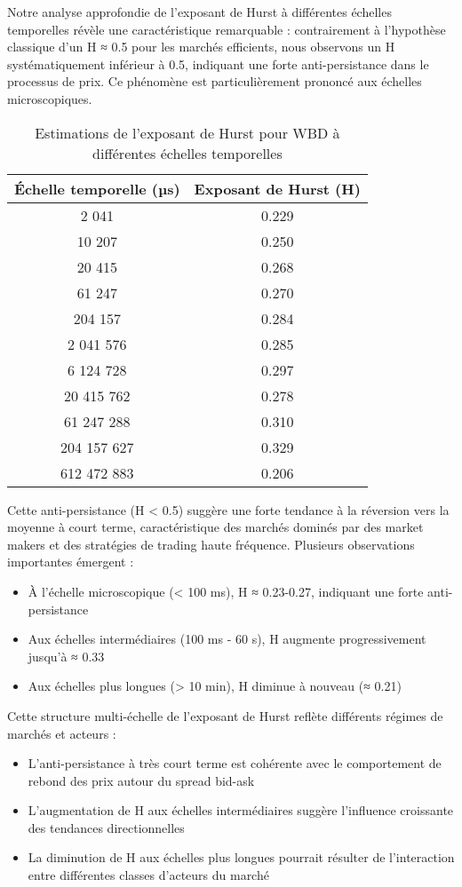 \documentclass[12pt,a4paper]{article}
\theoremstyle{definition}
\theoremstyle{remark}
\begin{document}
Notre analyse approfondie de l'exposant de Hurst à différentes échelles temporelles révèle une caractéristique remarquable : contrairement à l'hypothèse classique d'un H ≈ 0.5 pour les marchés efficients, nous observons un H systématiquement inférieur à 0.5, indiquant une forte anti-persistance dans le processus de prix. Ce phénomène est particulièrement prononcé aux échelles microscopiques.

\begin{table}[h!]
\centering
\begin{tabular}{|c|c|}
\hline
\textbf{Échelle temporelle (µs)} & \textbf{Exposant de Hurst (H)} \\
\hline
2 041 & 0.229 \\
10 207 & 0.250 \\
20 415 & 0.268 \\
61 247 & 0.270 \\
204 157 & 0.284 \\
2 041 576 & 0.285 \\
6 124 728 & 0.297 \\
20 415 762 & 0.278 \\
61 247 288 & 0.310 \\
204 157 627 & 0.329 \\
612 472 883 & 0.206 \\
\hline
\end{tabular}
\caption{Estimations de l'exposant de Hurst pour WBD à différentes échelles temporelles}
\label{tab:hurst_exponents}
\end{table}

Cette anti-persistance (H < 0.5) suggère une forte tendance à la réversion vers la moyenne à court terme, caractéristique des marchés dominés par des market makers et des stratégies de trading haute fréquence. Plusieurs observations importantes émergent :

\begin{itemize}
    \item À l'échelle microscopique (< 100 ms), H ≈ 0.23-0.27, indiquant une forte anti-persistance
    \item Aux échelles intermédiaires (100 ms - 60 s), H augmente progressivement jusqu'à ≈ 0.33
    \item Aux échelles plus longues (> 10 min), H diminue à nouveau (≈ 0.21)
\end{itemize}

Cette structure multi-échelle de l'exposant de Hurst reflète différents régimes de marchés et acteurs :
\begin{itemize}
    \item L'anti-persistance à très court terme est cohérente avec le comportement de rebond des prix autour du spread bid-ask
    \item L'augmentation de H aux échelles intermédiaires suggère l'influence croissante des tendances directionnelles
    \item La diminution de H aux échelles plus longues pourrait résulter de l'interaction entre différentes classes d'acteurs du marché
\end{itemize}
\end{document}
